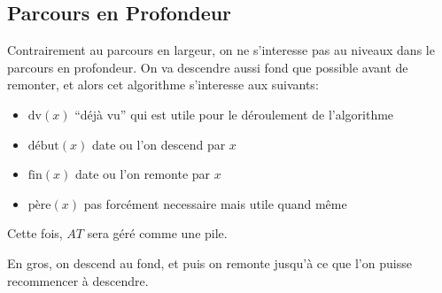 \documentclass[french]{article}
\theoremstyle{definition}
\begin{document}
		\subsection{Parcours en Profondeur}
		Contrairement au parcours en largeur, on ne s'interesse pas au niveaux dans le parcours en profondeur. On va descendre aussi fond que possible avant de remonter, et alors cet algorithme s'interesse aux suivants:
		\begin{itemize}
			\item $\text{dv}(x)$ ``déjà vu'' qui est utile pour le déroulement de l'algorithme
			\item $\text{début}(x)$ date ou l'on descend par $x$
			\item $\text{fin}(x)$ date ou l'on remonte par $x$
			\item $\text{père}(x)$ pas forcément necessaire mais utile quand même
		\end{itemize}
		Cette fois, $AT$ sera géré comme une pile.
		\\
		\begin{algorithmic}
			\ENDFOR
				\ELSE
					\ENDIF
				\ENDIF
			\ENDWHILE
		\end{algorithmic}

		En gros, on descend au fond, et puis on remonte jusqu'à ce que l'on puisse recommencer à descendre.
\end{document}
